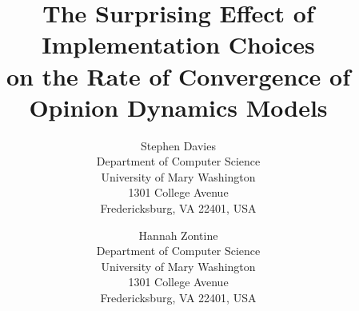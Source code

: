 \documentclass{wscpaperproc}
\begin{document}

\title{The Surprising Effect of Implementation Choices\\ on the Rate of
Convergence of Opinion Dynamics Models}

\author{Stephen Davies\\ [12pt]
Department of Computer Science \\
University of Mary Washington\\
1301 College Avenue \\
Fredericksburg, VA 22401, USA
\and
Hannah Zontine \\[12pt]
Department of Computer Science \\
University of Mary Washington\\
1301 College Avenue \\
Fredericksburg, VA 22401, USA
}

\maketitle










\appendix

\vspace{6pt}



\end{document}
